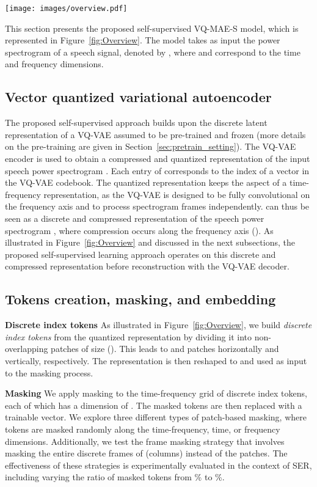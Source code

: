 \documentclass{article}
\newcommand{\myparagraph}[1]{\noindent\textbf{#1}\hspace{.25cm}}
\begin{document}
\begin{figure*}[t]
    \centering
    \texttt{[image: images/overview.pdf]}
    \caption{VQ-MAE-S model structure.}
    \label{fig:Overview}
\end{figure*}


This section presents the proposed self-supervised VQ-MAE-S model, which is represented in Figure~\ref{fig:Overview}. The model takes as input the power spectrogram of a speech signal, denoted by , where  and  correspond to the time and frequency dimensions. 

\subsection{Vector quantized variational autoencoder}

The proposed self-supervised approach builds upon the discrete latent representation of a VQ-VAE \cite{van2017neural} assumed to be pre-trained and frozen (more details on the pre-training are given in Section~\ref{sec:pretrain_setting}). The VQ-VAE encoder is used to obtain a compressed and quantized representation  of the input speech power spectrogram . Each entry of  corresponds to the index of a vector in the VQ-VAE codebook. The quantized representation  keeps the aspect of a time-frequency representation, as the VQ-VAE is designed to be fully convolutional on the frequency axis and to process spectrogram frames independently.  can thus be seen as a discrete and compressed representation of the speech power spectrogram , where compression occurs along the frequency axis (). As illustrated in Figure~\ref{fig:Overview} and discussed in the next subsections, the proposed self-supervised learning approach operates on this discrete and compressed representation before reconstruction with the VQ-VAE decoder.


\subsection{Tokens creation, masking, and embedding}
\label{sec:mask}

\myparagraph{Discrete index tokens} As illustrated in Figure~\ref{fig:Overview}, we build \emph{discrete index tokens} from the quantized representation  by dividing it into non-overlapping patches of size (). This leads to  and  patches horizontally and vertically, respectively. The representation  is then reshaped to  and used as input to the masking process. 

\myparagraph{Masking} We apply masking to the  time-frequency grid of discrete index tokens, each of which has a dimension of . The masked tokens are then replaced with a trainable vector. We explore three different types of patch-based masking, where tokens are masked randomly along the time-frequency, time, or frequency dimensions. Additionally, we test the frame masking strategy that involves masking the entire discrete frames of  (columns) instead of the patches. The effectiveness of these strategies is experimentally evaluated in the context of SER, including varying the ratio of masked tokens from \% to \%.
\end{document}
